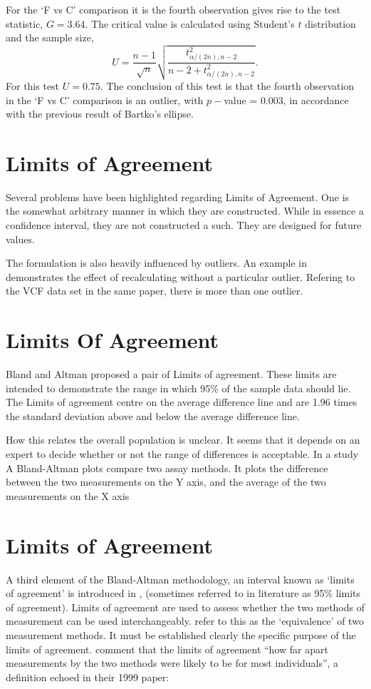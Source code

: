 \documentclass[12pt, a4paper]{report}
\theoremstyle{plain}
\theoremstyle{definition}
\theoremstyle{remark}
\begin{document}
For the `F vs C' comparison it is the fourth observation gives rise to the test statistic, $G = 3.64$. The critical value is
calculated using Student's $t$ distribution and the sample size,
\[
U = \frac{n-1}{\sqrt{n}} \sqrt{\frac{t_{\alpha/(2n),n-2}^2}{n - 2
		+ t_{\alpha/(2n),n-2}^2}}.
\]
For this test $U = 0.75$. The conclusion of this test is that the fourth observation in the `F vs C' comparison is an outlier, with $p-$value = 0.003, in accordance with the previous result of Bartko's ellipse.





\section{Limits of Agreement}

Several problems have been highlighted regarding Limits of Agreement. One is the somewhat arbitrary manner in which they are
constructed. While in essence a confidence interval, they are not constructed a such. They are designed for future values.

The formulation is also heavily influenced by outliers. An example in \citet*{BA83} demonstrates the effect of recalculating without
a particular outlier. Refering to the VCF data set in the same paper, there is more than one outlier.


\section{Limits Of Agreement}
Bland and Altman proposed a pair of Limits of agreement. These
limits are intended to demonstrate the range in which 95\% of the
sample data should lie. The Limits of agreement centre on the
average difference line and are 1.96 times the standard deviation
above and below the average difference line.

How this relates the overall population is unclear. It seems that
it depends on an expert to decide whether or not the range of
differences is acceptable. In a study A Bland-Altman plots compare
two assay methods. It plots the difference between the two
measurements on the Y axis, and the average of the two
measurements on the X axis

\section{Limits of Agreement}
A third element of the Bland-Altman methodology, an interval known
as `limits of agreement' is introduced in \citet*{BA86},
(sometimes referred to in literature as 95\% limits of agreement).
Limits of agreement are used to assess whether the two methods of
measurement can be used interchangeably. \citet{BA86} refer to
this as the `equivalence' of two measurement methods. It must be
established clearly the specific purpose of the limits of
agreement. \citet*{BA95} comment that the limits of agreement
``how far apart measurements by the two methods were likely to be
for most individuals'', a definition echoed in their 1999 paper:
\end{document}
